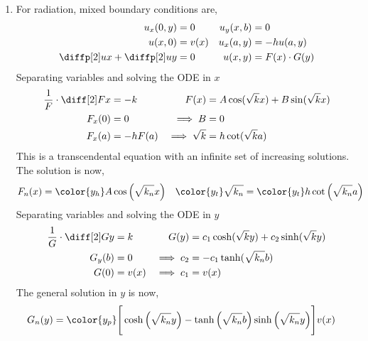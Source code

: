 \begin{enumerate}
    \item For radiation, mixed boundary conditions are,
          \begin{align}
              u_x(0, y)                  & = 0               &
              u_y(x, b)                  & = 0                 \\
              u(x, 0)                    & = v(x)            &
              u_x(a, y)                  & = -hu(a, y)         \\
              \diffp[2] ux +\diffp[2] uy & = 0               &
              u(x, y)                    & = F(x) \cdot G(y)
          \end{align}
          Separating variables and solving the ODE in $ x $
          \begin{align}
              \frac{1}{F} \cdot \diff[2] Fx & = -k                                  &
              F(x)                          & = A\cos(\sqrt{k}x) + B\sin(\sqrt{k}x)   \\
              F_x(0)                        & = 0                                   &
              \implies B                    & = 0                                     \\
              F_x(a)                        & = -hF(a)                              &
              \implies \sqrt{k}             & = h\cot(\sqrt{k}a)
          \end{align}
          This is a transcendental equation with an infinite set of increasing solutions.
          The solution is now,
          \begin{align}
              F_n(x)                 & = \color{y_h} A \cos\Big(\sqrt{k_n} x\Big) &
              \color{y_t} \sqrt{k_n} & = \color{y_t} h \cot\Big(\sqrt{k_n}a\Big)
          \end{align}
          Separating variables and solving the ODE in $ y $
          \begin{align}
              \frac{1}{G} \cdot \diff[2] Gy & = k                       &
              G(y)                          & = c_1 \cosh(\sqrt{k}y)
              + c_2\sinh(\sqrt{k}y)                                       \\
              G_y(b)                        & = 0                       &
              \implies c_2                  & = -c_1 \tanh(\sqrt{k_n}b)   \\
              G(0)                          & = v(x)                    &
              \implies c_1                  & = v(x)
          \end{align}
          The general solution in $ y $ is now,
          \begin{align}
              G_n(y) & = \color{y_p} \Bigg[\cosh\Big(\sqrt{k_n}y\Big)
                  - \tanh\Big(\sqrt{k_n}b\Big) \sinh\Big(\sqrt{k_n}y\Big)\Bigg] v(x)
          \end{align}


\end{enumerate}
